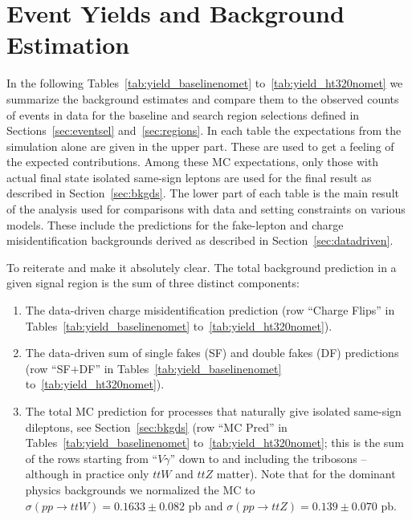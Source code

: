 \section{Event Yields and Background Estimation}
\label{sec:yields}

In the following Tables~\ref{tab:yield_baselinenomet} 
to~\ref{tab:yield_ht320nomet}
we summarize the background 
estimates and compare them to the
observed counts of events in data for the baseline and search region selections
defined in Sections~\ref{sec:eventsel} and~\ref{sec:regions}.
In each table the expectations from the simulation alone are given 
in the upper part.
 These are used to get a feeling of the expected contributions.
Among these MC expectations, 
only those with actual final state 
isolated same-sign leptons are used for the final result
as described in Section~\ref{sec:bkgds}.
The lower part of each table is the main result of the analysis
used for comparisons with data and setting constraints on various models.
These include the predictions for the fake-lepton and charge misidentification
backgrounds derived as described in Section~\ref{sec:datadriven}.

To reiterate and make it absolutely clear.  The total background
prediction in a given signal region
is the sum of three distinct components:
\begin{enumerate}

\item The data-driven charge misidentification prediction (row ``Charge Flips'' in
Tables~\ref{tab:yield_baselinenomet} to~\ref{tab:yield_ht320nomet}).

\item The data-driven sum of single fakes (SF) and double fakes
(DF) predictions (row ``SF$+$DF''
in Tables~\ref{tab:yield_baselinenomet} to~\ref{tab:yield_ht320nomet}).

\item The total MC prediction for processes that naturally give isolated
same-sign dileptons, see Section~\ref{sec:bkgds} (row ``MC Pred'' in
Tables~\ref{tab:yield_baselinenomet} to~\ref{tab:yield_ht320nomet};
this is the sum of the rows starting from ``$V\gamma$'' down to 
and including the tribosons -- although in practice only $ttW$ and 
$ttZ$ matter).  Note that for the dominant physics 
backgrounds we normalized the MC to $\sigma(pp \to ttW) = 0.1633 \pm 0.082$
pb and $\sigma(pp \to ttZ) = 0.139 \pm 0.070$ pb.

\end{enumerate}

